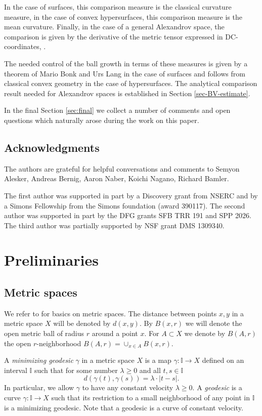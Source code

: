 \documentclass[12pt,leqno,intlimits]{amsart}
\numberwithin{equation}{section}
\theoremstyle{definition}
\theoremstyle{remark}
\def\:{\colon}
\begin{document}
In the case of surfaces, this comparison measure is the classical curvature measure, in the case of convex hypersurfaces, this comparison measure is the mean curvature.
Finally, in the case of a general Alexandrov space, the comparison is given by the derivative of the metric tensor expressed in DC-coordinates, \cite{Per-DC}.

The needed control of the ball growth in terms of these measures is given by a theorem of Mario  Bonk and Urs Lang in the case of surfaces and follows from classical convex geometry in the case of hypersurfaces.
The analytical comparison result needed for Alexandrov spaces is established in Section \ref{sec-BV-estimate}.

In the final Section \ref{sec:final} we collect a number of comments and open questions which naturally arose during the work on this paper.

\subsection{Acknowledgments} The authors are grateful for helpful conversations and comments to Semyon Alesker, Andreas Bernig, Aaron Naber, Koichi Nagano, Richard Bamler.

The first author was supported in part by a Discovery grant from NSERC and by a Simons Fellowship from the Simons foundation (award 390117).
The second author was supported in part by the DFG grants SFB TRR 191 and SPP 2026.
The third author was partially supported by NSF grant DMS 1309340.

\section{Preliminaries} \label{sec:prelim}
\subsection{Metric spaces}
We refer to \cite{BBI01} for basics on metric spaces.
The distance between points $x,y$ in a metric space $X$ will be denoted by $d(x,y)$.
By $B(x,r)$ we will denote the open metric ball of radius $r$ around a point $x$. For $A\subset X$
we denote by $B (A,r)$ the open $r$-neighborhood $B (A,r) =\cup _{x\in A} B (x,r)$.

A \emph {minimizing geodesic} $\gamma$ in a metric space $X$ is a map $\gamma \: \mathbb I\to X$ defined on an interval $\mathbb I$ such that for some number $\lambda \geq 0$ and all $t,s\in \mathbb I$
$$ d(\gamma (t),\gamma (s)) =\lambda \cdot |t-s|.$$
In particular, we allow $\gamma$ to have any constant velocity $\lambda \geq 0$.
A \emph{geodesic} is a curve $\gamma\: \mathbb I\to X$ such that its restriction to a small neighborhood of any point in $\mathbb I$ is a minimizing geodesic.
Note that a geodesic is a curve of constant velocity.
\end{document}
